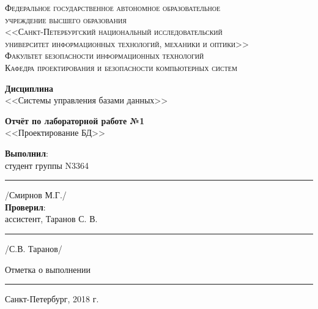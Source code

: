 \begin{titlepage}
	\begin{center}
		\textsc{
			\fontsize{12pt}{14pt}\selectfont
			Федеральное государственное автономное образовательное\\
			учреждение высшего образования\\
			<<Санкт-Петербургский национальный исследовательский\\
			университет информационных технологий, механики и оптики>>\\
			Факультет безопасности информационных технологий\\
			Кафедра проектирования и безопасности компьютерных систем\\}
		
		\vfill
		
		\textbf{Дисциплина}\\
		<<Системы управления базами данных>>\\
		
		\vfill
		
		\textbf{Отчёт по лабораторной работе №1}\\
		<<Проектирование БД>>\\

	\end{center}

	\vfill
	
	\begin{flushright}
	\textbf{Выполнил}: \\
	студент группы N3364\\
	\rule{10em}{.1pt} /Смирнов М.Г./\\
	\vfill
	\textbf{Проверил}:\\
	ассистент, Таранов С. В.\\

	\rule{10em}{.1pt} /С.В. Таранов/\\
	
	\vfill
	
	Отметка о выполнении \rule{10em}{.1pt}
	
	
		


	\end{flushright}
	\vfill
	\begin{center}
		Санкт-Петербург, 2018 г.
	\end{center}
\end{titlepage}